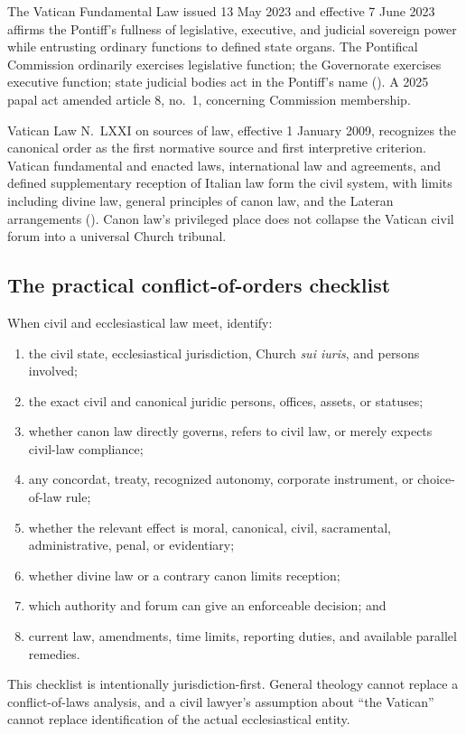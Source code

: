 The Vatican Fundamental Law issued 13 May 2023 and effective 7 June 2023 affirms the Pontiff's fullness of legislative, executive, and judicial sovereign power while entrusting ordinary functions to defined state organs. The Pontifical Commission ordinarily exercises legislative function; the Governorate exercises executive function; state judicial bodies act in the Pontiff's name (). A 2025 papal act  amended article 8, no.~1, concerning Commission membership.

Vatican Law N.~LXXI on sources of law, effective 1 January 2009, recognizes the canonical order as the first normative source and first interpretive criterion. Vatican fundamental and enacted laws, international law and agreements, and defined supplementary reception of Italian law form the civil system, with limits including divine law, general principles of canon law, and the Lateran arrangements (). Canon law's privileged place does not collapse the Vatican civil forum into a universal Church tribunal.

\subsection{The practical conflict-of-orders checklist}

When civil and ecclesiastical law meet, identify:

\begin{enumerate}
\item the civil state, ecclesiastical jurisdiction, Church \emph{sui iuris}, and persons involved;
\item the exact civil and canonical juridic persons, offices, assets, or statuses;
\item whether canon law directly governs, refers to civil law, or merely expects civil-law compliance;
\item any concordat, treaty, recognized autonomy, corporate instrument, or choice-of-law rule;
\item whether the relevant effect is moral, canonical, civil, sacramental, administrative, penal, or evidentiary;
\item whether divine law or a contrary canon limits reception;
\item which authority and forum can give an enforceable decision; and
\item current law, amendments, time limits, reporting duties, and available parallel remedies.
\end{enumerate}

This checklist is intentionally jurisdiction-first. General theology cannot replace a conflict-of-laws analysis, and a civil lawyer's assumption about ``the Vatican'' cannot replace identification of the actual ecclesiastical entity.
